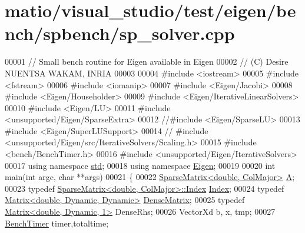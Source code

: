\hypertarget{matio_2visual__studio_2test_2eigen_2bench_2spbench_2sp__solver_8cpp_source}{}\section{matio/visual\+\_\+studio/test/eigen/bench/spbench/sp\+\_\+solver.cpp}
\label{matio_2visual__studio_2test_2eigen_2bench_2spbench_2sp__solver_8cpp_source}

\begin{DoxyCode}
00001 \textcolor{comment}{// Small bench routine for Eigen available in Eigen}
00002 \textcolor{comment}{// (C) Desire NUENTSA WAKAM, INRIA}
00003 
00004 \textcolor{preprocessor}{#include <iostream>}
00005 \textcolor{preprocessor}{#include <fstream>}
00006 \textcolor{preprocessor}{#include <iomanip>}
00007 \textcolor{preprocessor}{#include <Eigen/Jacobi>}
00008 \textcolor{preprocessor}{#include <Eigen/Householder>}
00009 \textcolor{preprocessor}{#include <Eigen/IterativeLinearSolvers>}
00010 \textcolor{preprocessor}{#include <Eigen/LU>}
00011 \textcolor{preprocessor}{#include <unsupported/Eigen/SparseExtra>}
00012 \textcolor{comment}{//#include <Eigen/SparseLU>}
00013 \textcolor{preprocessor}{#include <Eigen/SuperLUSupport>}
00014 \textcolor{comment}{// #include <unsupported/Eigen/src/IterativeSolvers/Scaling.h>}
00015 \textcolor{preprocessor}{#include <bench/BenchTimer.h>}
00016 \textcolor{preprocessor}{#include <unsupported/Eigen/IterativeSolvers>}
00017 \textcolor{keyword}{using namespace }\hyperlink{namespacestd}{std};
00018 \textcolor{keyword}{using namespace }\hyperlink{namespace_eigen}{Eigen};
00019 
00020 \textcolor{keywordtype}{int} main(\textcolor{keywordtype}{int} argc, \textcolor{keywordtype}{char} **args)
00021 \{
00022   \hyperlink{group___sparse_core___module_class_eigen_1_1_sparse_matrix}{SparseMatrix<double, ColMajor>} \hyperlink{group___core___module_class_eigen_1_1_matrix}{A}; 
00023   \textcolor{keyword}{typedef} \hyperlink{group___sparse_core___module_class_eigen_1_1_sparse_matrix}{SparseMatrix<double, ColMajor>::Index} 
      \hyperlink{namespace_eigen_a62e77e0933482dafde8fe197d9a2cfde}{Index};
00024   \textcolor{keyword}{typedef} \hyperlink{group___core___module_class_eigen_1_1_matrix}{Matrix<double, Dynamic, Dynamic>} 
      \hyperlink{group___core___module}{DenseMatrix};
00025   \textcolor{keyword}{typedef} \hyperlink{group___core___module_class_eigen_1_1_matrix}{Matrix<double, Dynamic, 1>} DenseRhs;
00026   VectorXd b, x, tmp;
00027   \hyperlink{class_eigen_1_1_bench_timer}{BenchTimer} timer,totaltime; 

\end{DoxyCode}
